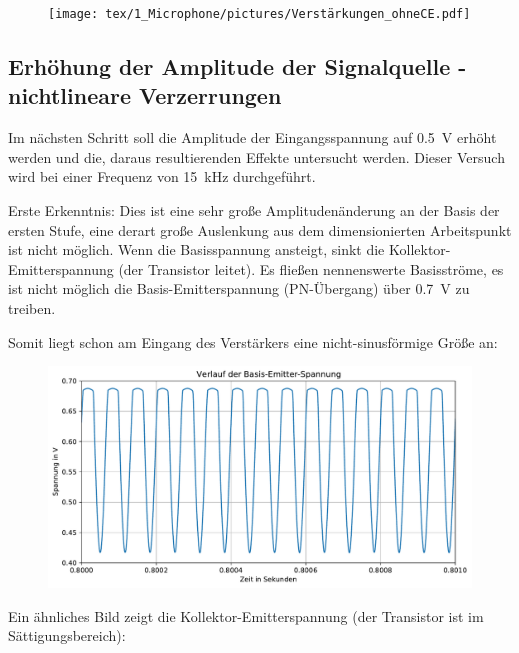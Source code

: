 \begin{figure}[H]
    \centering
    \texttt{[image: tex/1\_Microphone/pictures/Verstärkungen\_ohneCE.pdf]}
    \label{fig:my_label}
\end{figure}

\subsection{Erhöhung der Amplitude der Signalquelle - nichtlineare Verzerrungen}

Im nächsten Schritt soll die Amplitude der Eingangsspannung auf \SI{0.5}{\volt} erhöht werden und die, daraus resultierenden Effekte untersucht werden. Dieser Versuch wird bei einer Frequenz von \SI{15}{\kilo \hertz} durchgeführt.

Erste Erkenntnis: Dies ist eine sehr große Amplitudenänderung an der Basis der ersten Stufe, eine derart große Auslenkung aus dem dimensionierten Arbeitspunkt ist nicht möglich. Wenn die Basisspannung ansteigt, sinkt die Kollektor-Emitterspannung (der Transistor leitet). Es fließen nennenswerte Basisströme, es ist nicht möglich die Basis-Emitterspannung (PN-Übergang) über \SI{0.7}{\volt} zu treiben.

Somit liegt schon am Eingang des Verstärkers eine nicht-sinusförmige Größe an:

\begin{figure}[H]
    \centering
    \includegraphics[width = \textwidth]{tex/1_Microphone/pictures/BaseEmitterVoltage.pdf}
    \label{fig:my_label}
\end{figure}

Ein ähnliches Bild zeigt die Kollektor-Emitterspannung (der Transistor ist im Sättigungsbereich):

